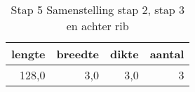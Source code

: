 \begin{table}[h!]
\centering
\caption{Stap 5 Samenstelling stap 2, stap 3 en achter rib}
\begin{tabular}{rrrr}
\toprule
 lengte &  breedte &  dikte &  aantal \\
\midrule
  128,0 &      3,0 &    3,0 &       3 \\
\bottomrule
\end{tabular}
\end{table}
